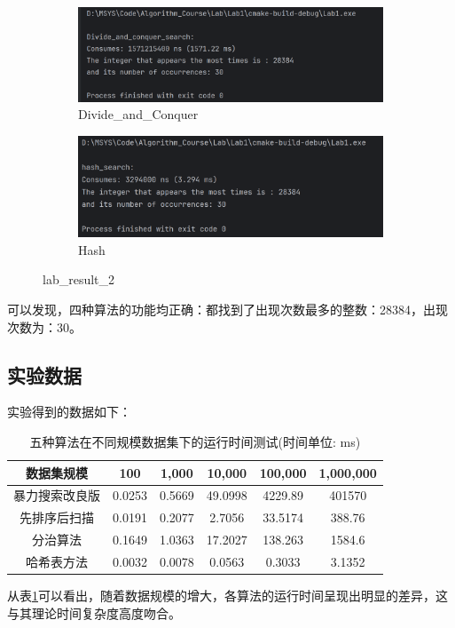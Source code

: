 \documentclass[UTF8,12pt,a4paper]{ctexart}
\begin{document}
\begin{figure}[htbp]
    \centering
    \begin{subfigure}[b]{0.45\textwidth} %
        \centering
        \includegraphics[width=\textwidth]{figures/divide_and_conquer.png} %
        \caption{Divide\_and\_Conquer}
        \label{fig:divide_and_conquer}
    \end{subfigure}
    \hfill %
    \begin{subfigure}[b]{0.45\textwidth}
        \centering
        \includegraphics[width=\textwidth]{figures/hash.png} %
        \caption{Hash}
        \label{fig:hash}
    \end{subfigure}
    \caption{lab\_result\_2}
    \label{fig:run_reuslt_2}
\end{figure}

可以发现，四种算法的功能均正确：都找到了出现次数最多的整数：28384，出现次数为：30。
\subsection{实验数据}
实验得到的数据如下：
\begin{table}[h]
    \centering
    \begin{tabular}{|c|c|c|c|c|c|}
    \hline
    数据集规模 & 100 & 1,000 & 10,000 & 100,000 & 1,000,000 \\
    \hline
    暴力搜索改良版 & 0.0253 & 0.5669 & 49.0998 & 4229.89 & 401570\\
    \hline
    先排序后扫描 & 0.0191 & 0.2077 & 2.7056 & 33.5174 & 388.76\\
    \hline
    分治算法 & 0.1649 & 1.0363 & 17.2027 & 138.263 & 1584.6\\
    \hline
    哈希表方法 & 0.0032 & 0.0078 & 0.0563 & 0.3033 & 3.1352\\
    \hline
\end{tabular}
\caption{五种算法在不同规模数据集下的运行时间测试(时间单位: ms)}
\label{tab:time_results}
\end{table}
从表\ref{tab:time_results}可以看出，随着数据规模的增大，各算法的运行时间呈现出明显的差异，这与其理论时间复杂度高度吻合。
\end{document}
